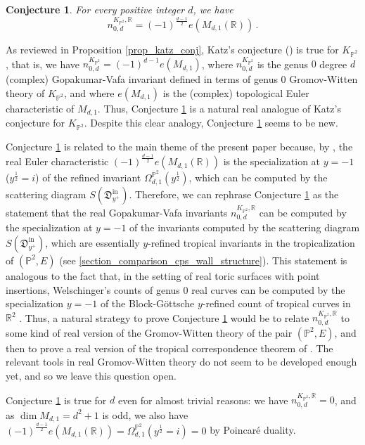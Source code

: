\documentclass[11pt,letterpaper]{amsart}
\newtheorem{conj}[defn]{Conjecture}
\newcommand\PP{\mathbb P}
\newcommand\R{\mathbb R}
\newcommand\fD{\mathfrak D}
\newcommand\iin{\mathrm{in}}
\begin{document}
\begin{conj} \label{conj_real}
For every positive integer $d$, we have 
\[n_{0,d}^{K_{\PP^2},\R}=(-1)^{\frac{d-1}{2}} e(M_{d,1}(\R))\,.\]
\end{conj}


As reviewed in Proposition
\ref{prop_katz_conj}, Katz's conjecture
(\cite[Conjecture 2.3]{MR2420017}) is true for $K_{\PP^2}$,
that is, we have $n_{0,d}^{K_{\PP^2}}
=(-1)^{d-1} e(M_{d,1})$, where 
$n_{0,d}^{K_{\PP^2}}$ is the genus $0$
degree $d$ (complex) Gopakumar-Vafa invariant defined in terms of 
genus $0$ Gromov-Witten theory of 
$K_{\PP^2}$, and where $e(M_{d,1})$
is the (complex) topological Euler characteristic of $M_{d,1}$.
Thus, Conjecture \ref{conj_real} is a natural real analogue of Katz's conjecture for $K_{\PP^2}$. Despite this clear analogy, Conjecture \ref{conj_real} seems to be new.



Conjecture \ref{conj_real} is related to the main theme of the present paper because, by \cite[Theorem 6.4]{bousseau2019scattering},
the real Euler characteristic  
$(-1)^{\frac{d-1}{2}} e(M_{d,1}(\R))$ is the specialization at
$y=-1$ ($y^{\frac{1}{2}}=i$) of the refined invariant $\Omega_{d,1}^{\PP^2}(y^{\frac{1}{2}})$, 
which can be computed by the scattering diagram 
$S(\fD^{\iin}_{y^+})$.
Therefore, we can rephrase Conjecture 
\ref{conj_real} as the statement 
that the real Gopakumar-Vafa invariants 
$n_{0,d}^{K_{\PP^2},\R}$ can be computed 
by the specialization at $y=-1$ of the invariants computed by the scattering diagram $S(\fD^{\iin}_{y^+})$, which are essentially $y$-refined tropical invariants in the tropicalization of 
$(\PP^2,E)$ (see  \cref{section_comparison_cps_wall_structure}).
This statement is analogous to the fact that, in the setting of real toric surfaces
with point insertions, Welschinger's counts 
of genus $0$ real curves can be computed by the 
specialization $y=-1$ of the Block-Göttsche 
$y$-refined count of 
tropical curves in 
$\R^2$ \cite{MR2137980, MR3453390}.
Thus, a natural strategy to prove Conjecture 
\ref{conj_real} would be to relate 
$n_{0,d}^{K_{\PP^2},\R}$ to some kind of real version of the Gromov-Witten theory of the pair $(\PP^2,E)$, and then to prove 
a real version of the tropical correspondence theorem of \cite{gabele2019tropical}. 
The relevant tools in real Gromov-Witten theory do not seem to be developed enough yet, 
and so we leave this question open.


Conjecture \ref{conj_real} is true for $d$ even for almost trivial reasons:
we have $n_{0,d}^{K_{\PP^2},\R}=0$, and as 
$\dim M_{d,1}=d^2+1$ is odd, we also have $(-1)^{\frac{d-1}{2}} e(M_{d,1}(\R))=\Omega_{d,1}^{\PP^2}(y^{\frac{1}{2}}=i)=0$ by Poincar\'e duality.
\end{document}
